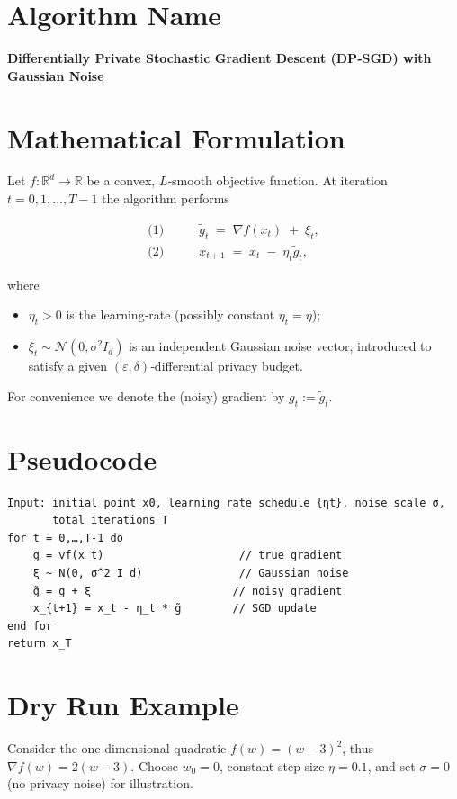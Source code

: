 \documentclass{article}
\newcommand{\RR}{\mathbb{R}}
\begin{document}
\section*{Algorithm Name}
\textbf{Differentially Private Stochastic Gradient Descent (DP‑SGD) with Gaussian Noise}

\section*{Mathematical Formulation}
Let $f:\RR^{d}\rightarrow\RR$ be a convex, $L$‑smooth objective function.  
At iteration $t=0,1,\dots ,T-1$ the algorithm performs

\[
\begin{aligned}
\text{(1)}\qquad &\tilde{g}_t \;=\; \nabla f(x_t) \;+\; \xi_t, \\[2mm]
\text{(2)}\qquad &x_{t+1}\;=\; x_t \;-\; \eta_t \tilde{g}_t ,
\end{aligned}
\]

where  

\begin{itemize}
    \item $\eta_t>0$ is the learning‑rate (possibly constant $\eta_t=\eta$);
    \item $\xi_t\sim\mathcal N(0,\sigma^2 I_d)$ is an independent Gaussian noise vector,  
          introduced to satisfy a given $(\varepsilon,\delta)$‑differential privacy budget.
\end{itemize}

For convenience we denote the (noisy) gradient by $g_t:=\tilde{g}_t$.

\section*{Pseudocode}
\begin{verbatim}
Input: initial point x0, learning rate schedule {ηt}, noise scale σ,
       total iterations T
for t = 0,…,T‑1 do
    g = ∇f(x_t)                     // true gradient
    ξ ~ N(0, σ^2 I_d)               // Gaussian noise
    g̃ = g + ξ                      // noisy gradient
    x_{t+1} = x_t - η_t * g̃        // SGD update
end for
return x_T
\end{verbatim}

\section*{Dry Run Example}
Consider the one‑dimensional quadratic $f(w)=(w-3)^2$, thus $\nabla f(w)=2(w-3)$.  
Choose $w_0=0$, constant step size $\eta=0.1$, and set $\sigma=0$ (no privacy noise) for illustration.
\end{document}
